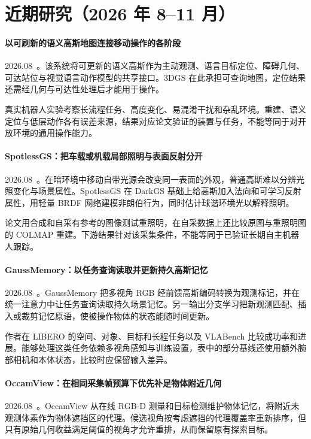 \section{近期研究（2026 年 8--11 月）}
\paragraph{以可刷新的语义高斯地图连接移动操作的各阶段}
2026.08~\cite{2608_10756}。该系统将可更新的语义高斯作为主动观测、语言目标定位、障碍几何、可达站位与视觉语言动作模型的共享接口。3DGS 在此承担可查询地图，定位结果还需经几何与可达性处理后才能用于操作。

真实机器人实验考察长流程任务、高度变化、易混淆干扰和杂乱环境。重建、语义定位与低层动作各有误差来源，结果对应论文验证的装置与任务，不能等同于对开放环境的通用操作能力。

\paragraph{SpotlessGS：把车载或机载局部照明与表面反射分开}
2026.08~\cite{2608_14713}。在暗环境中移动自带光源会改变同一表面的外观，普通高斯难以分辨光照变化与场景属性。SpotlessGS 在 DarkGS 基础上给高斯加入法向和可学习反射属性，用轻量 BRDF 网络建模非朗伯行为，同时估计球谐环境光以解释照明。

论文用合成和自采有参考的图像测试重照明，在自采数据上还比较原图与重照明图的 COLMAP 重建。下游结果针对该采集条件，不能等同于已验证长期自主机器人跟踪。

\paragraph{GaussMemory：以任务查询读取并更新持久高斯记忆}
2026.08~\cite{2608_14986}。GaussMemory 把多视角 RGB 经前馈高斯编码转换为观测标记，并在统一注意力中让任务查询读取持久场景记忆。另一输出分支学习把新观测匹配、插入或裁剪记忆原语，使被操作物体的状态能随时间更新。

作者在 LIBERO 的空间、对象、目标和长程任务以及 VLABench 比较成功率和进展。能够处理这类任务依赖多视角感知与训练设置，表中的部分基线还使用额外腕部相机和本体状态，比较时应保留输入差异。

\paragraph{OccamView：在相同采集帧预算下优先补足物体附近几何}
2026.08~\cite{2608_16499}。OccamView 从在线 RGB-D 测量和目标检测维护物体记忆，将附近未观测体素作为物体遮挡区的代理。候选视角按考虑遮挡的代理覆盖率重新排序，但只有原始几何收益满足阈值的视角才允许重排，从而保留原有探索目标。

